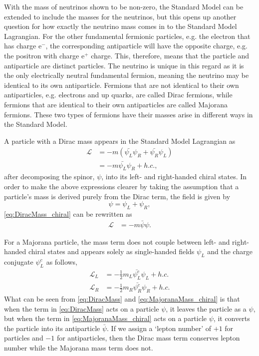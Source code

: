 With the mass of neutrinos shown to be non-zero, the Standard Model can be extended to include the masses for the neutrinos, but this opens up another question for how exactly the neutrino mass comes in to the Standard Model Lagrangian.
For the other fundamental fermionic particles, e.g. the electron that has charge $\textrm{e}^-$, the corresponding antiparticle will have the opposite charge, e.g. the positron with charge $\textrm{e}^+$ charge.
This, therefore, means that the particle and antiparticle are distinct particles.
The neutrino is unique in this regard as it is the only electrically neutral fundamental fermion, meaning the neutrino may be identical to its own antiparticle.
Fermions that are not identical to their own antiparticles, e.g. electrons and up quarks, are called Dirac fermions, while fermions that are identical to their own antiparticles are called Majorana fermions.
These two types of fermions have their masses arise in different ways in the Standard Model.

A particle with a Dirac mass appears in the Standard Model Lagrangian as
\begin{align}
\mathcal{L} &= -m(\bar{\psi_L}\psi_R + \bar{\psi_R}\psi_L) \\
&= -m\bar{\psi_L}\psi_R + h.c.,
\label{eq:DiracMass_chiral}
\end{align}
after decomposing the spinor, $\psi$, into its left- and right-handed chiral states.
In order to make the above expressions clearer by taking the assumption that a particle's mass is derived purely from the Dirac term, the field is given by
\begin{equation}
\psi = \psi_L + \psi_R,
\end{equation}
\autoref{eq:DiracMass_chiral} can be rewritten as
\begin{align}
\mathcal{L} &= -m\bar{\psi}\psi. \label{eq:DiracMass}
\end{align}

For a Majorana particle, the mass term does not couple between left- and right-handed chiral states and appears solely as single-handed fields $\psi_L$ and the charge conjugate $\psi_L^c$ as follows,
\begin{align}
\mathcal{L}_L &= -\frac{1}{2}m_L\bar{\psi^c_L}\psi_L+h.c. \label{eq:MajoranaMass_chiral} \\
\mathcal{L}_R &= -\frac{1}{2}m_R\bar{\psi^c_R}\psi_R+h.c.
\end{align}
What can be seen from \autoref{eq:DiracMass} and \autoref{eq:MajoranaMass_chiral} is that when the term in \autoref{eq:DiracMass} acts on a particle $\psi$, it leaves the particle as a $\psi$, but when the term in \autoref{eq:MajoranaMass_chiral} acts on a particle $\psi$, it converts the particle into its antiparticle $\bar{\psi}$.
If we assign a `lepton number' of $+1$ for particles and $-1$ for antiparticles, then the Dirac mass term conserves lepton number while the Majorana mass term does not.

